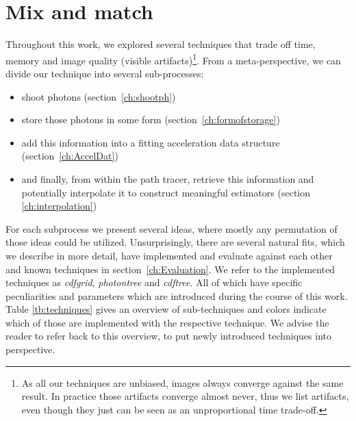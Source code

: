 \section{Mix and match}

Throughout this work, we explored several techniques that trade off time, memory and image quality (visible artifacts)\footnote{As all our techniques are unbiased, images always converge against the same result. In practice those artifacts converge almost never, thus we list artifacts, even though they just can be seen as an unproportional time trade-off.}. From a meta-perspective, we can divide our technique into several sub-processes:

\begin{itemize}
    \item shoot photons (section~\ref{ch:shootph})
    \item store those photons in some form (section~\ref{ch:formofstorage})
    \item add this information into a fitting acceleration data structure (section~\ref{ch:AccelDat})
    \item and finally, from within the path tracer, retrieve this information and potentially interpolate it to construct meaningful estimators (section \ref{ch:interpolation})
\end{itemize}

For each subprocess we present several ideas, where mostly any permutation of those ideas could be utilized. Unsurprisingly, there are several natural fits, which we describe in more detail, have implemented and evaluate against each other and known techniques in section~\ref{ch:Evaluation}. We refer to the implemented techniques as \textit{cdfgrid}, \textit{photontree} and \textit{cdftree}. All of which have specific peculiarities and parameters which are introduced during the course of this work. Table \ref{tb:techniques} gives an overview of sub-techniques and colors indicate which of those are implemented with the respective technique. We advise the reader to refer back to this overview, to put newly introduced techniques into perspective.

